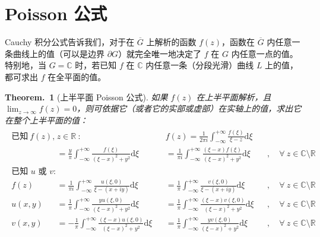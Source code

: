 \documentclass[UTF8]{report}
\def\R{\mathbb{R}}
\def\C{\mathbb{C}}
\theoremstyle{MyLineTheoremStyle} %
\theoremstyle{MyBlockTheoremStyle} %
\newtheorem{BlockTheorem}[LineTheorem]{Theorem.\,} %
\theoremstyle{MySubsubsectionStyle} %
\begin{document}
\section{Poisson 公式}

Cauchy 积分公式告诉我们，对于在 $\overline{G} $ 上解析的函数 $f(z)$，函数在 $\overline{G} $ 内任意一条曲线上的值（可以是边界 $\partial G$）就完全唯一地决定了 $f$ 在 $G$ 内任意一点的值。特别地，当 $ G = \C$ 时，若已知 $f$ 在 $\C$ 内任意一条（分段光滑）曲线 $L$ 上的值，都可求出 $f$ 在全平面的值。

\begin{BlockTheorem}[上半平面 Poisson 公式]\label{上半平面 Poisson 公式}
如果 $f(z)$ 在上半平面解析，且 $\lim_{z \to \infty} f(z) = 0$，则可依据它（或者它的实部或虚部）在实轴上的值，求出它在整个上半平面的值：
\begin{gather}
    \begin{aligned}
        \text{已知}\ f(z),& z \in \R\ \text{:}  \quad \quad \quad 
        && f(z) 
        = \frac{1}{2 \pi i} \int_{-\infty}^{+ \infty} \frac{f(\xi)}{\xi - z} \mathrm{d}\xi \\ 
        &= \frac{y}{\pi} \int_{-\infty}^{+ \infty} \frac{f(\xi)}{(\xi - x)^2 + y^2} \mathrm{d}\xi 
        &&=  \frac{1}{\pi i} \int_{-\infty}^{+ \infty} \frac{ (\xi - x)f(\xi)}{(\xi - x)^2 + y^2} \mathrm{d}\xi &&,\quad \forall\ z \in \C \setminus \R
        \\
        \text{已知 $u$ 或 $v$: }& \\
        f(z) 
        &= \frac{1}{\pi i} \int_{-\infty}^{+ \infty} \frac{ u(\xi, 0) }{\xi - (x + iy)} \mathrm{d}\xi
        &&= \frac{1}{\pi} \int_{-\infty}^{+ \infty} \frac{ v(\xi, 0) }{\xi - (x + iy)} \mathrm{d}\xi  &&,\quad \forall\ z \in \C \setminus \R
        \\ 
        u(x,y) 
        &= \frac{1}{\pi} \int_{-\infty}^{+ \infty} \frac{ yu(\xi, 0)}{(\xi - x)^2 + y^2} \mathrm{d}\xi 
        &&= \frac{1}{\pi} \int_{-\infty}^{+ \infty} \frac{ (\xi - x)v(\xi, 0)}{(\xi - x)^2 + y^2} \mathrm{d}\xi  &&,\quad \forall\ z \in \C \setminus \R
        \\ 
        v(x,y) 
        &= - \frac{1}{\pi} \int_{-\infty}^{+ \infty} \frac{ (\xi - x)u(\xi, 0)}{(\xi - x)^2 + y^2} \mathrm{d}\xi 
        &&= \frac{1}{\pi} \int_{-\infty}^{+ \infty} \frac{ yv(\xi, 0)}{(\xi - x)^2 + y^2} \mathrm{d}\xi  &&,\quad \forall\ z \in \C \setminus \R
    \end{aligned}
    \end{gather}

\end{BlockTheorem}
\end{document}
